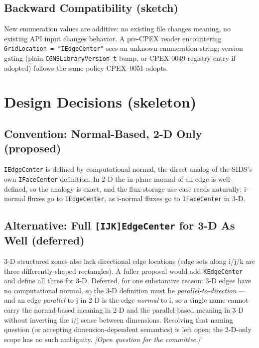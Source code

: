 \documentclass[11pt,letterpaper]{article}
\begin{document}
\subsection{Backward Compatibility (sketch)}

New enumeration values are additive: no existing file changes meaning,
no existing API input changes behavior. A pre-CPEX reader encountering
\texttt{GridLocation~=~"IEdgeCenter"} sees an unknown enumeration string;
version gating (plain \texttt{CGNSLibraryVersion\_t} bump, or CPEX-0049
registry entry if adopted) follows the same policy CPEX~0051 adopts.

\section{Design Decisions (skeleton)}

\subsection{Convention: Normal-Based, 2-D Only (proposed)}

\texttt{IEdgeCenter} is defined by computational normal, the direct
analog of the SIDS's own \texttt{IFaceCenter} definition. In 2-D the
in-plane normal of an edge is well-defined, so the analogy is exact, and
the flux-storage use case reads naturally: i-normal fluxes go to
\texttt{IEdgeCenter}, as i-normal fluxes go to \texttt{IFaceCenter} in
3-D.

\subsection{Alternative: Full \texttt{[IJK]EdgeCenter} for 3-D As Well (deferred)}

3-D structured zones also lack directional edge locations (edge sets
along i/j/k are three differently-shaped rectangles). A fuller proposal
would add \texttt{KEdgeCenter} and define all three for 3-D. Deferred,
for one substantive reason: 3-D edges have no computational normal, so
the 3-D definition must be \emph{parallel-to-direction} --- and an
edge \emph{parallel} to j in 2-D is the edge \emph{normal} to i, so a
single name cannot carry the normal-based meaning in 2-D and the
parallel-based meaning in 3-D without inverting the i/j sense between
dimensions. Resolving that naming question (or accepting
dimension-dependent semantics) is left open; the 2-D-only scope has no
such ambiguity. \emph{[Open question for the committee.]}
\end{document}
